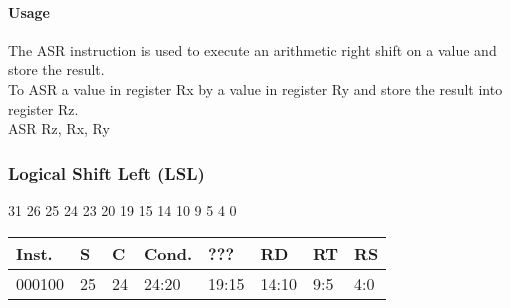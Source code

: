 \documentclass[12pt]{article}
\begin{document}
    \paragraph{Usage}
    \begin{flushleft}
    The ASR instruction is used to execute an arithmetic right shift on a value and store the result.\\
    \vspace{1em}
    To ASR a value in register Rx by a value in register Ry and store the result into register Rz.\\
    \vspace{1em}
    ASR Rz, Rx, Ry
    \end{flushleft}
   
   

   


    \newpage
    \subsubsection{Logical Shift Left (LSL)}
    
    \hspace{1.6cm}31 \hspace{1.2cm}26 \hspace{.075cm}25 \hspace{.15cm}24 \hspace{.075cm}23 \hspace{.875cm}20 \hspace{.04cm}19 \hspace{.8cm}15 \hspace{.04cm}14 \hspace{.8cm}10 \hspace{.04cm}9 \hspace{1.15cm}5 \hspace{.04cm}4 \hspace{1.25cm}0
    \vspace{-.25cm}
    \begin{center}
        \begin{tabular}{ |p{1.8cm}|p{.3cm}|p{.3cm}|p{1.5cm}|p{1.5cm}|p{1.5cm}|p{1.5cm}|p{1.5cm}| }
            \hline
            \textbf{Inst.} & \textbf{S}& \textbf{C} & \textbf{Cond.} & ??? & \textbf{RD} & \textbf{RT} & \textbf{RS}\\
            \hline
            000100& 25 & 24 & 24:20 & 19:15 & 14:10 & 9:5 & 4:0\\
            \hline
        \end{tabular}
    \end{center}
    
\end{document}

